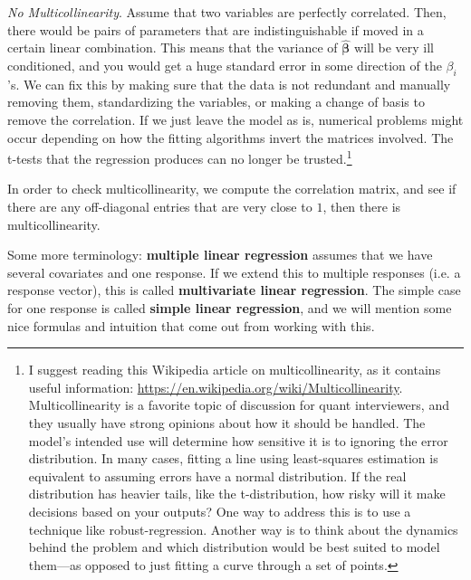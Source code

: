 \textit{No Multicollinearity}. Assume that two variables are perfectly correlated. Then, there would be pairs of parameters that are indistinguishable if moved in a certain linear combination. This means that the variance of $\hat{\boldsymbol{\beta}}$ will be very ill conditioned, and you would get a huge standard error in some direction of the $\beta_i$'s. We can fix this by making sure that the data is not redundant and manually removing them, standardizing the variables, or making a change of basis to remove the correlation. If we just leave the model as is, numerical problems might occur depending on how the fitting algorithms invert the matrices involved. The t-tests that the regression produces can no longer be trusted.\footnote{I suggest reading this Wikipedia article on multicollinearity, as it contains useful information: \url{https://en.wikipedia.org/wiki/Multicollinearity}. Multicollinearity is a favorite topic of discussion for quant interviewers, and they usually have strong opinions about how it should be handled. The model's intended use will determine how sensitive it is to ignoring the error distribution. In many cases, fitting a line using least-squares estimation is equivalent to assuming errors have a normal distribution. If the real distribution has heavier tails, like the t-distribution, how risky will it make decisions based on your outputs? One way to address this is to use a technique like robust-regression. Another way is to think about the dynamics behind the problem and which distribution would be best suited to model them---as opposed to just fitting a curve through a set of points.} 

In order to check multicollinearity, we compute the correlation matrix, and see if there are any off-diagonal entries that are very close to $1$, then there is multicollinearity. 

Some more terminology: \textbf{multiple linear regression} assumes that we have several covariates and one response. If we extend this to multiple responses (i.e. a response vector), this is called \textbf{multivariate linear regression}. The simple case for one response is called \textbf{simple linear regression}, and we will mention some nice formulas and intuition that come out from working with this. 

